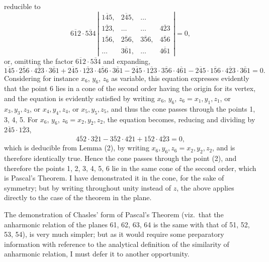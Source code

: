 \documentclass[11pt]{article}
\begin{document}
reducible to
\[
\overline{612}\cdot\overline{534}\,\left|\begin{array}{cccc}
\overline{145}, & \overline{245}, & \ldots & \\
\overline{123}, & \ldots & \ldots & \overline{423} \\
\overline{156}, & \overline{256}, & \overline{356}, & \overline{456} \\
\ldots & \overline{361}, & \ldots & \overline{461}
\end{array}\right| = 0,
\]
or, omitting the factor $\overline{612}\cdot\overline{534}$ and expanding,
\[
\overline{145}\cdot\overline{256}\cdot\overline{423}\cdot\overline{361} + \overline{245}\cdot\overline{123}\cdot\overline{456}\cdot\overline{361} - \overline{245}\cdot\overline{123}\cdot\overline{356}\cdot\overline{461} - \overline{245}\cdot\overline{156}\cdot\overline{423}\cdot\overline{361} = 0.
\]
Considering for instance $x_6$, $y_6$, $z_6$ as variable, this equation expresses evidently that the point 6 lies in a cone of the second order having the origin for its vertex, and the equation is evidently satisfied by writing $x_6$, $y_6$, $z_6 = x_1, y_1, z_1$, or $x_3, y_3, z_3$, or $x_4, y_4, z_4$, or $x_5, y_5, z_5$, and thus the cone passes through the points 1, 3, 4, 5. For $x_6$, $y_6$, $z_6 = x_2, y_2, z_2$, the equation becomes, reducing and dividing by $\overline{245}\cdot\overline{123}$,
\[
\overline{452}\cdot\overline{321} - \overline{352}\cdot\overline{421} + \overline{152}\cdot\overline{423} = 0,
\]
which is deducible from Lemma (2), by writing $x_6, y_6, z_6 = x_2, y_2, z_2$, and is therefore identically true. Hence the cone passes through the point (2), and therefore the points 1, 2, 3, 4, 5, 6 lie in the same cone of the second order, which is Pascal's Theorem. I have demonstrated it in the cone, for the sake of symmetry; but by writing throughout unity instead of $z$, the above applies directly to the case of the theorem in the plane.

The demonstration of Chasles' form of Pascal's Theorem (viz.\ that the anharmonic relation of the planes 61, 62, 63, 64 is the same with that of 51, 52, 53, 54), is very much simpler; but as it would require some preparatory information with reference to the analytical definition of the similarity of anharmonic relation, I must defer it to another opportunity.

\bigskip
\end{document}
